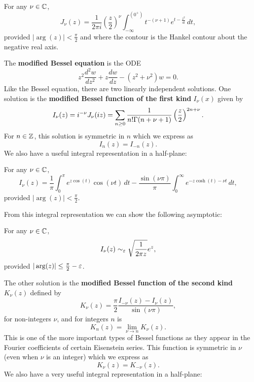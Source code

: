    \begin{proposition*}
      For any $\nu \in \mathbb{C}$,
      \[
        J_{\nu}(z) = \frac{1}{2\pi i}\left(\frac{z}{2}\right)^{\nu}\int_{-\infty}^{(0^{+})}t^{-(\nu+1)}e^{t-\frac{z^{2}}{4t}}\,dt,
      \]
      provided $|\arg(z)| < \frac{\pi}{2}$ and where the contour is the Hankel contour about the negative real axis.
    \end{proposition*}

    The \textbf{modified Bessel equation} is the ODE
    \[
      z^{2}\frac{d^{2}w}{dz^{2}}+z\frac{dw}{dz}-(z^{2}+\nu^{2})w = 0.
    \]
    Like the Bessel equation, there are two linearly independent solutions. One solution is the \textbf{modified Bessel function of the first kind} $I_{\nu}(x)$ given by
    \[
      I_{\nu}(z) = i^{-\nu}J_{\nu}(iz) = \sum_{n \ge 0}\frac{1}{n!\Gamma(n+\nu+1)}\left(\frac{z}{2}\right)^{2n+\nu}.
    \]
    For $n \in \mathbb{Z}$, this solution is symmetric in $n$ which we express as
    \[
      I_{n}(z) = I_{-n}(z).
    \]
    We also have a useful integral representation in a half-plane:

    \begin{proposition}\label{prop:integral_representation_I-Bessel_function}
      For any $\nu \in \mathbb{C}$,
      \[
        I_{\nu}(z) = \frac{1}{\pi}\int_{0}^{\pi}e^{z\cos(t)}\cos(\nu t)\,dt-\frac{\sin(\nu\pi)}{\pi}\int_{0}^{\infty}e^{-z\cosh(t)-\nu t}\,dt,
      \]
      provided $|\arg(z)| < \frac{\pi}{2}$.
    \end{proposition}

    From this integral representation we can show the following asymptotic:

    \begin{lemma}\label{lem:I_Bessel_function_asymptotic}
      For any $\nu \in \mathbb{C}$,
      \[
        I_{\nu}(z) \sim_{\varepsilon} \sqrt{\frac{1}{2\pi z}}e^{z},
      \]
      provided $|\arg(z)| \le \frac{\pi}{2}-\varepsilon$.
    \end{lemma}

    The other solution is the \textbf{modified Bessel function of the second kind} $K_{\nu}(z)$ defined by
    \[
      K_{\nu}(z) = \frac{\pi}{2}\frac{I_{-\nu}(z)-I_{\nu}(z)}{\sin(\nu\pi)},
    \]
    for non-integers $\nu$, and for integers $n$ is
    \[
      K_{n}(z)= \lim_{\nu \to n}K_{\nu}(z).
    \]
    This is one of the more important types of Bessel functions as they appear in the Fourier coefficients of certain Eisenstein series. This function is symmetric in $\nu$ (even when $\nu$ is an integer) which we express as
    \[
      K_{\nu}(z) = K_{-\nu}(z).
    \]
    We also have a very useful integral representation in a half-plane:

